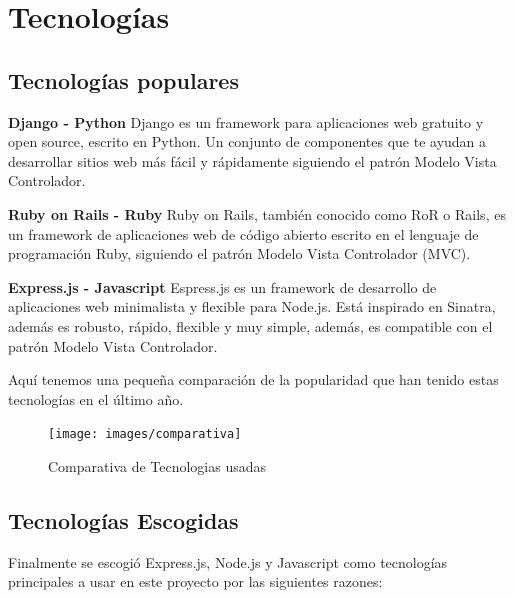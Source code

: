 
\section{Tecnologías}
\label{3:sec1}

\subsection{Tecnologías populares}
\label{3:1:1}
{\bf Django - Python}
Django es un framework para aplicaciones web gratuito y open source, escrito en Python. Un conjunto de componentes que te ayudan a desarrollar sitios web más fácil y rápidamente siguiendo el patrón Modelo Vista Controlador.

{\bf Ruby on Rails - Ruby}
Ruby on Rails, también conocido como RoR o Rails, es un framework de aplicaciones web de código abierto escrito en el lenguaje de programación Ruby, siguiendo el patrón Modelo Vista Controlador (MVC).

{\bf Express.js - Javascript}
Espress.js  es un framework de desarrollo de aplicaciones web minimalista y flexible para Node.js. Está inspirado en Sinatra, además es robusto, rápido, flexible y muy simple, además, es compatible con el patrón Modelo Vista Controlador.

Aquí tenemos una pequeña comparación de la popularidad que han tenido estas tecnologías en el último año.

\begin{figure}[!th]
\begin{center}
\texttt{[image: images/comparativa]}
\caption{Comparativa de Tecnologias usadas}
\label{fig:Comparativa de Tecnologias usadas}
\end{center}
\end{figure}



\subsection{Tecnologías Escogidas}
\label{3:1:2}

Finalmente se escogió Express.js, Node.js y Javascript como tecnologías principales a usar en este proyecto por las siguientes razones:

